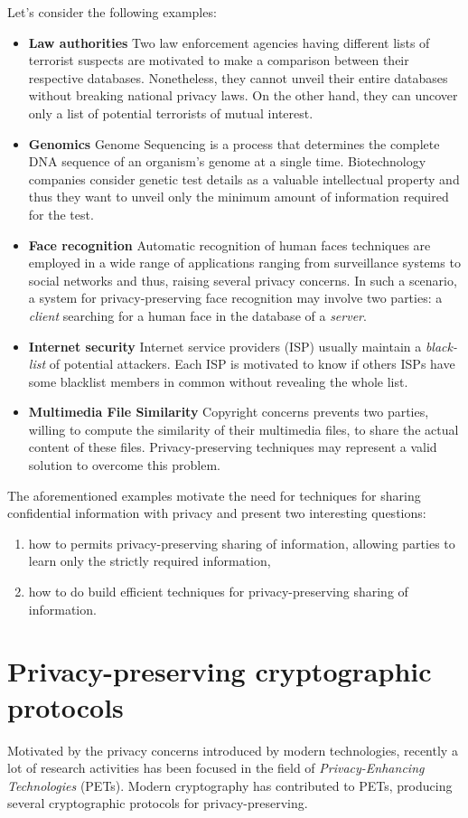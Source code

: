 \documentclass[dvips,12pt]{article}
\begin{document}
Let's consider the following examples:
\begin{itemize}
\item \textbf{Law authorities} Two law enforcement agencies having different lists of terrorist suspects are motivated to make a comparison between their respective databases. Nonetheless, they cannot unveil their entire databases without breaking national privacy laws. On the other hand, they can uncover only a list of potential terrorists of mutual interest.
\item \textbf{Genomics} Genome Sequencing is a process that determines the complete DNA sequence of an organism's genome at a single time. Biotechnology companies consider genetic test details as a valuable intellectual property and thus they want to unveil only the minimum amount of information required for the test.
\item \textbf{Face recognition} Automatic recognition of human faces techniques are employed in a wide range of applications ranging from surveillance systems to social networks and thus, raising several privacy concerns. In such a scenario, a system for privacy-preserving face recognition may involve two parties: a \emph{client} searching for a human face in the database of a \emph{server}.
\item \textbf{Internet security} Internet service providers (ISP) usually maintain a \emph{black-list} of potential attackers. Each ISP is motivated to know if others ISPs have some blacklist members in common without revealing the whole list.
\item \textbf{Multimedia File Similarity} Copyright concerns prevents two parties, willing to compute the similarity of their multimedia files, to share the actual content of these files. Privacy-preserving techniques may represent a valid solution to overcome this problem.
\end{itemize} 

The aforementioned examples motivate the need for techniques for sharing confidential information with privacy and present two interesting questions: 
\begin{enumerate}
\item how to permits privacy-preserving sharing of information, allowing parties to learn only the strictly required information, 
\item how to do build efficient techniques for privacy-preserving sharing of information.
\end{enumerate} 


\section{Privacy-preserving cryptographic protocols}
Motivated by the privacy concerns introduced by modern technologies, recently a lot of research activities has been focused in the field of \emph{Privacy-Enhancing Technologies} (PETs).
Modern cryptography has contributed to PETs, producing several cryptographic protocols for privacy-preserving.
 
\end{document}
